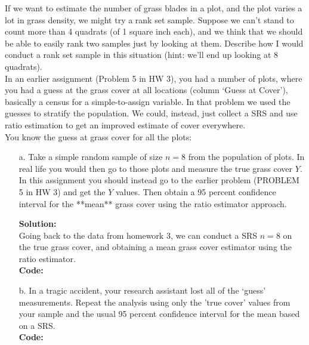 \documentclass[12pt]{article}
\makeatletter
\theoremstyle{homework}
\newenvironment{exercise}[1]
{\def\@currentlabel{#1}\exercisecore}
{\endexercisecore}
\newcommand{\localhead}[1]{\par\smallskip\noindent\textbf{#1}\nobreak\\}%
\newcommand\solution{\localhead{Solution:}}
\makeatother
\begin{document}
\vspace{1in}

\begin{exercise}{2.} If we want to estimate the number of grass blades in a plot, and the plot varies a lot
  in grass density, we might try a rank set sample.  Suppose we can't stand to count more than 4 quadrats
  (of 1 square inch each), and we think that we should be able to easily rank two samples just by looking
  at them.  Describe how I would conduct a rank set sample in this situation (hint:  we'll end up looking
  at 8 quadrats).\\

  In an earlier assignment (Problem 5 in HW 3), you had a number of plots, where you had a guess at the 
  grass cover at all locations (column ‘Guess at Cover’), basically a census for a simple-to-assign variable. 
  In that problem we used the guesses to stratify the population. We could, instead, just collect a SRS 
  and use ratio estimation to get an improved estimate of cover everywhere.\\
  
  You know the guess at grass cover for all the plots:
  \begin{center}
    
  \end{center}

  \begin{enumerate}
    \item[a.] Take a simple random sample of size $n=8$ from the population of plots. In real life 
    you would then go to those plots and measure the true grass cover $Y$. In this assignment 
    you should instead go to the earlier problem (PROBLEM 5 in HW 3) and get the $Y$ values.  
    Then obtain a 95 percent confidence interval for the **mean** grass cover using the ratio 
    estimator approach.\\
    \solution Going back to the data from homework 3, we can conduct a SRS $n = 8$ on the 
    true grass cover, and obtaining a mean grass cover estimator using the ratio estimator.\\
    \textbf{Code:}
    \begin{center}
   
    \end{center}
    \vspace{.15in}

    \item[b.]In a tragic accident, your research assistant lost all of the ‘guess’ measurements. 
    Repeat the analysis using only the 'true cover' values from your sample and the usual 95 percent 
    confidence interval for the mean based on a SRS.\\
    \textbf{Code:}
    \begin{center}
   
    \end{center}
    \vspace{.15in}


\end{enumerate}
\end{exercise}
\end{document}
